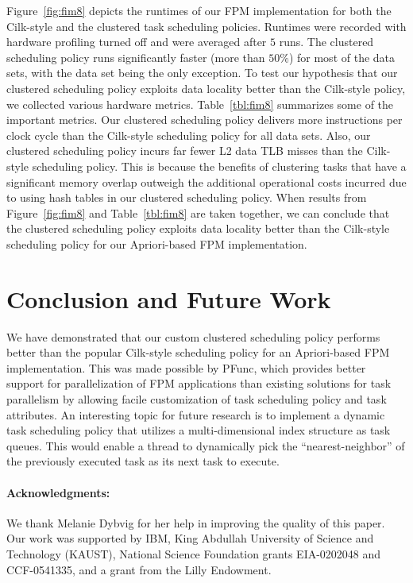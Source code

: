 \documentclass{IOS-Book-Article}
\begin{document}
Figure~\ref{fig:fim8} depicts the runtimes of our FPM implementation for both
the Cilk-style and the clustered task scheduling policies. Runtimes were
recorded with hardware profiling turned off and were averaged after $5$ runs.
The clustered scheduling policy runs significantly faster (more than $50\%$)
for most of the data sets, with the  data set being the
only exception. To test our hypothesis that our clustered scheduling policy
exploits data locality better than the Cilk-style policy, we collected
various hardware metrics.  Table~\ref{tbl:fim8} summarizes some of the
important metrics. Our clustered scheduling policy delivers more instructions
per clock cycle than the Cilk-style scheduling policy for all data sets.
Also, our clustered scheduling policy incurs far fewer L2 data TLB misses
than the Cilk-style scheduling policy. This is because the benefits of
clustering tasks that have a significant memory overlap outweigh the
additional operational costs incurred due to using hash tables in our
clustered scheduling policy.
When results from Figure~\ref{fig:fim8} and Table~\ref{tbl:fim8} are taken
together, we can conclude that the clustered scheduling policy exploits
data locality better than the Cilk-style scheduling policy for our
Apriori-based FPM implementation.

\section{Conclusion and Future Work}
We have demonstrated that our custom clustered scheduling policy performs
better than the popular Cilk-style scheduling policy for an Apriori-based FPM
implementation. This was made possible by PFunc, which provides better support
for parallelization of FPM applications than existing solutions for task
parallelism by allowing facile customization of task scheduling policy and
task attributes. An interesting topic for future research is to implement a
dynamic task scheduling policy that utilizes a multi-dimensional index
structure as task queues.  This would enable a thread to dynamically pick the
``nearest-neighbor'' of the previously executed task as its next task to
execute. 

\paragraph{\textbf{Acknowledgments:}}
We thank Melanie Dybvig for her help in improving the quality of this paper.
Our work was supported by IBM, King Abdullah University of Science and
Technology (KAUST), National Science Foundation grants EIA-0202048 and
CCF-0541335, and a grant from the Lilly Endowment.



\end{document}
